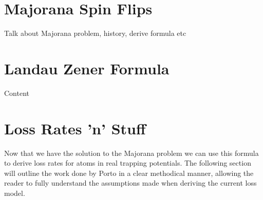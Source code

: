 
\section{Majorana Spin Flips}

Talk about Majorana problem, history, derive formula etc


\section{Landau Zener Formula}

Content

\section{Loss Rates 'n' Stuff}

Now that we have the solution to the Majorana problem we can use this formula to derive loss rates for atoms in real trapping potentials.
The following section will outline the work done by Porto \cite{Lin2009,Dubessy2014} in a clear methodical manner, allowing the reader to fully understand the assumptions made when deriving the current loss model.

